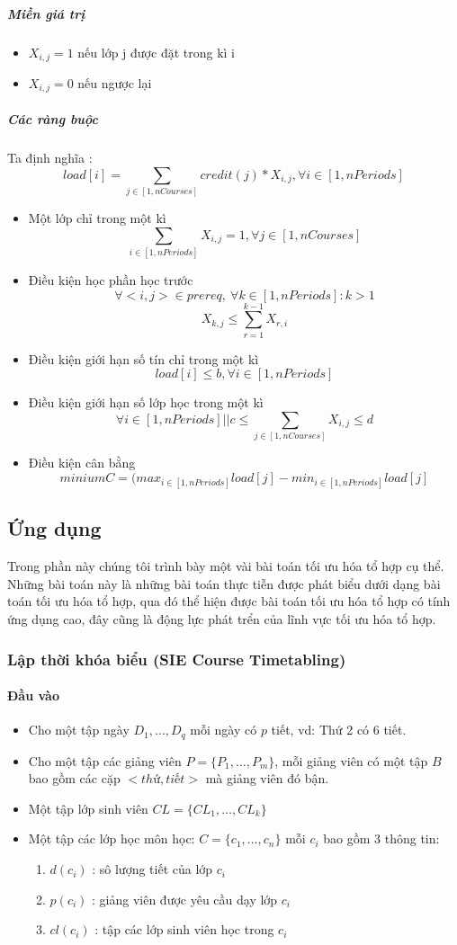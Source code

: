 \documentclass[a4paper,12pt]{report}
\begin{document}
\subparagraph{Miền giá trị}
\begin{itemize}
\item $X_{i,j}=1$ nếu lớp j được đặt trong kì i
\item $X_{i,j}=0$ nếu ngược lại 
\end{itemize}
\subparagraph{Các ràng buộc}
Ta định nghĩa : $$load[i]=\sum_{j \in [1,nCourses] } credit(j) *X_{i,j}   ,\forall i \in [1,nPeriods]$$
\begin{itemize}
\item Một lớp chỉ trong một kì 
$$   \sum_{i \in [1,nPeriods] } X_{i,j}=1,\forall j \in[1,nCourses]  $$

\item Điều kiện học phần học trước $$ \forall<i,j> \in prereq, \ \forall k \in [1,nPeriods]: k>1  $$
$$X_{k,j} \leq \sum^{k-1}_{r=1} X_{r,i} $$ 
\item Điều kiện giới hạn số tín chỉ trong một kì $$load[i] \leq b, \forall i \in [1,nPeriods]$$
\item Điều kiện giới hạn số lớp học trong một kì $$\forall i \in [1,nPeriods]|| c \leq \sum_{j \in [1,nCourses]} X_{i,j} \leq d$$
\item Điều kiện cân bằng $$minium  C= (max_{i \in [1,nPeriods]} load[j] -min_{i \in [1,nPeriods]} load[j] $$
\end{itemize}
\subsection{Ứng dụng}
Trong phần này chúng tôi trình bày một vài bài toán tối ưu hóa tổ hợp cụ thể. Những bài toán này là những bài toán thực tiễn được phát biểu dưới dạng bài toán tối ưu hóa tổ hợp, qua đó thể hiện được bài toán tối ưu hóa tổ hợp có tính ứng dụng cao, đây cũng là động lực phát trển của lĩnh vực tối ưu hóa tổ hợp\cite{TUHTT}.
\subsubsection{Lập thời khóa biểu (SIE Course Timetabling)}



\paragraph{Đầu vào}
\begin{itemize}
\item Cho một tập ngày $D_1,\ldots, D_q$ mỗi ngày có $p$ tiết, vd: Thứ 2 có 6 tiết.
\item Cho một tập các giảng viên $P=\{P_1,\ldots,P_m\}$, mỗi giảng viên có một tập $B$ bao gồm các cặp $<thứ,tiết>$ mà giảng viên đó bận.
\item Một tập lớp sinh viên $CL=\{CL_1,\ldots,CL_k\}$
\item Một tập các lớp học môn học: $C=\{c_1,\ldots, c_n\}$ mỗi $c_i$ bao gồm 3 thông tin: 
	\begin{enumerate}
	\item $d(c_i)$ : sô lượng tiết của lớp $c_i$
	\item $p(c_i)$ : giảng viên được yêu cầu dạy lớp $c_i$
	\item $cl(c_i)$ : tập các lớp sinh viên học trong $c_i$
	\end{enumerate}
\end{itemize} 
\end{document}
